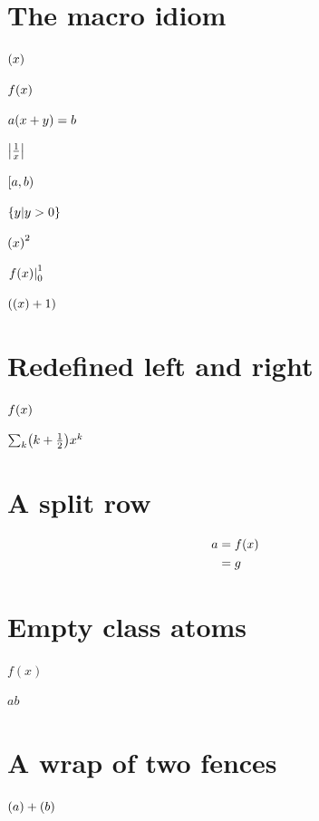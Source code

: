 \documentclass{article}
\begin{document}
\section{The macro idiom}
\makeatletter
\def\delopen{\mathopen{}\mathclose\bgroup\left}
\def\delclose{\aftergroup\egroup\right}
\makeatother
$\delopen( x \delclose)$\par
$f\delopen( x \delclose)$\par
$a\delopen( x+y \delclose) = b$\par
$\delopen| \frac{1}{x} \delclose|$\par
$\delopen[ a, b \delclose)$\par
$\delopen\{ y \middle| y>0 \delclose\}$\par
$\delopen( x \delclose)^2$\par
$\delopen. f(x) \delclose|_{0}^{1}$\par
$\delopen( \delopen( x \delclose) + 1 \delclose)$

\section{Redefined left and right}
\makeatletter
\begingroup
\let\@left\left \let\@right\right
\def\left{\mathopen{}\mathclose\bgroup\@left}
\def\right{\aftergroup\egroup\@right}
$f\left( x \right)$\par
$\sum_k \left( k + \frac12 \right) x^k$
\endgroup
\makeatother

\section{A split row}
\begin{equation}
\begin{split}
a &= f\mathopen{}\mathclose{\left( x \right)} \\
  &= g
\end{split}
\end{equation}

\section{Empty class atoms}
$f\mathopen{}(x)$\par
$a \mathclose{} b$

\section{A wrap of two fences}
$\mathclose{\left(a\right)+\left(b\right)}$
\end{document}
